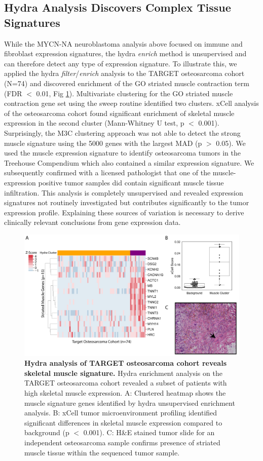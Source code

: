 \documentclass[10pt,letterpaper]{article}
\begin{document}
\subsection*{Hydra Analysis Discovers Complex Tissue Signatures}
While the MYCN-NA neuroblastoma analysis above focused on immune and fibroblast expression signatures, the hydra \textit{enrich} method is unsupervised and can therefore detect any type of expression signature. To illustrate this, we applied the hydra \textit{filter}/\textit{enrich} analysis to the TARGET osteosarcoma cohort (N=74) and discovered enrichment of the GO striated muscle contraction term (FDR $<$ 0.01, Fig \ref{muscle}). Multivariate clustering for the GO striated muscle contraction gene set using the sweep routine identified two clusters. xCell analysis of the osteosarcoma cohort found significant enrichment of skeletal muscle expression in the second cluster (Mann-Whitney U test, p $<$ 0.001). Surprisingly, the M3C clustering approach was not able to detect the strong muscle signature using the 5000 genes with the largest MAD (p $>$ 0.05). We used the muscle expression signature to identify osteosarcoma tumors in the Treehouse Compendium which also contained a similar expression signature. We subsequently confirmed with a licensed pathologist that one of the muscle-expression positive tumor samples did contain significant muscle tissue infiltration. This analysis is completely unsupervised and revealed expression signatures not routinely investigated but contributes significantly to the tumor expression profile. Explaining these sources of variation is necessary to derive clinically relevant conclusions from gene expression data.

%
%
\begin{figure}[!h]
	\includegraphics[width=\textwidth]{img/PNG/muscle-signature-genes-2x}
	\caption{{\bf Hydra analysis of TARGET osteosarcoma cohort reveals skeletal muscle signature.}
		 Hydra enrichment analysis on the TARGET osteosarcoma cohort revealed a subset of patients with high skeletal muscle expression. A: Clustered heatmap shows the muscle signature genes identified by hydra unsupervised enrichment analysis. B: xCell tumor microenvironment profiling identified significant differences in skeletal muscle expression compared to background (p $<$ 0.001). C: H\&E stained tumor slide for an independent osteosarcoma sample confirms presence of striated muscle tissue within the sequenced tumor sample.}
	\label{muscle}
\end{figure}
\end{document}
